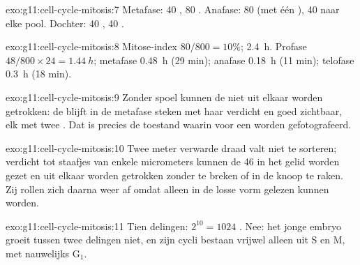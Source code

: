 \begin{solution}{exo:g11:cell-cycle-mitosis:7}
Metafase: 40 , 80 . Anafase: 80  (met
één ), 40 naar elke pool. Dochter: 40 , 40
.
\end{solution}

\begin{solution}{exo:g11:cell-cycle-mitosis:8}
Mitose-index $80/800 = 10\%$;  \qty{2.4}{h}. Profase
$48/800 \times 24 = \qty{1.44}{h}$; metafase \qty{0.48}{h} (29 min);
anafase \qty{0.18}{h} (11 min); telofase \qty{0.3}{h} (18 min).
\end{solution}

\begin{solution}{exo:g11:cell-cycle-mitosis:9}
Zonder spoel kunnen de  niet uit elkaar worden getrokken: de
 blijft in de metafase steken met haar  verdicht en goed
zichtbaar, elk met twee . Dat is precies de toestand waarin
 voor een  worden gefotografeerd.
\end{solution}

\begin{solution}{exo:g11:cell-cycle-mitosis:10}
Twee meter verwarde draad valt niet te sorteren; verdicht tot staafjes
van enkele micrometers kunnen de 46  in het gelid worden gezet
en uit elkaar worden getrokken zonder te breken of in de knoop te raken.
Zij rollen zich daarna weer af omdat  alleen in de losse vorm
gelezen kunnen worden.
\end{solution}

\begin{solution}{exo:g11:cell-cycle-mitosis:11}
Tien delingen: $2^{10} = 1024$ . Nee: het jonge embryo groeit
tussen twee delingen niet, en zijn cycli bestaan vrijwel alleen uit S en
M, met nauwelijks $\mathrm{G_1}$.
\end{solution}

